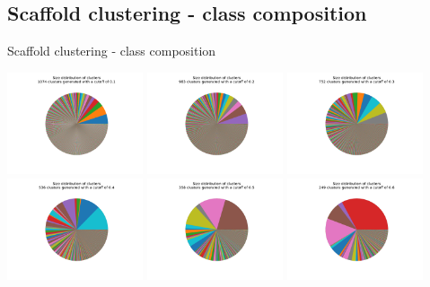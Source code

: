 \documentclass{beamer}
\begin{document}
\subsection{Scaffold clustering - class composition}
\begin{frame}{Scaffold clustering - class composition}

\includegraphics[width=0.3\textwidth]{../outputs/scaffold_clusters_0.1.pdf}
\includegraphics[width=0.3\textwidth]{../outputs/scaffold_clusters_0.2.pdf}
\includegraphics[width=0.3\textwidth]{../outputs/scaffold_clusters_0.3.pdf}
\includegraphics[width=0.3\textwidth]{../outputs/scaffold_clusters_0.4.pdf}
\includegraphics[width=0.3\textwidth]{../outputs/scaffold_clusters_0.5.pdf}
\includegraphics[width=0.3\textwidth]{../outputs/scaffold_clusters_0.6.pdf}

\end{frame}
\end{document}
